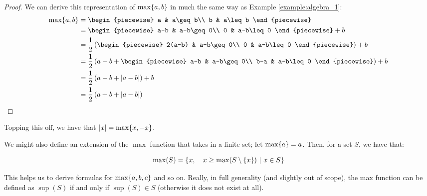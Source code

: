 \begin{proof}
    We can derive this representation of $\max\{a,b\}$ in much the same way as Example \ref{example:algebra_1}:
    \begin{align*}
        \max\br{a,b} &=\begin{piecewise}
            a & a\geq b\\
            b & a\leq b
        \end{piecewise} \\
        &=\begin{piecewise}
            a-b & a-b\geq 0\\
            0 & a-b\leq 0
        \end{piecewise}+b \\
        &=\frac{1}{2}\left(\begin{piecewise}
            2(a-b) & a-b\geq 0\\
            0 & a-b\leq 0
        \end{piecewise}\right)+b \\
        &=\frac{1}{2}\left(a-b+\begin{piecewise}
            a-b & a-b\geq 0\\
            b-a & a-b\leq 0
        \end{piecewise}\right)+b \\
        &=\frac{1}{2}\left(a-b+\abs{a-b}\right)+b \\
        &=\frac{1}{2}\left(a+b+\abs{a-b}\right) \\
    \end{align*}
\end{proof}

Topping this off, we have that $\abs{x}=\max\{x,-x\}$.

We might also define an extension of the $\max$ function that takes in a finite set; let $\max\{a\}=a$. Then, for a set $S$, we have that:

$$
    \max(S)=\left\{x,\quad x\geq\max(S\setminus\{x\})\ \middle|\ x\in S\right\}
$$

This helps us to derive formulas for $\max\{a,b,c\}$ and so on. Really, in full generality (and slightly out of scope), the max function can be defined as $\sup(S)$ if and only if $\sup(S)\in S$ (otherwise it does not exist at all).

